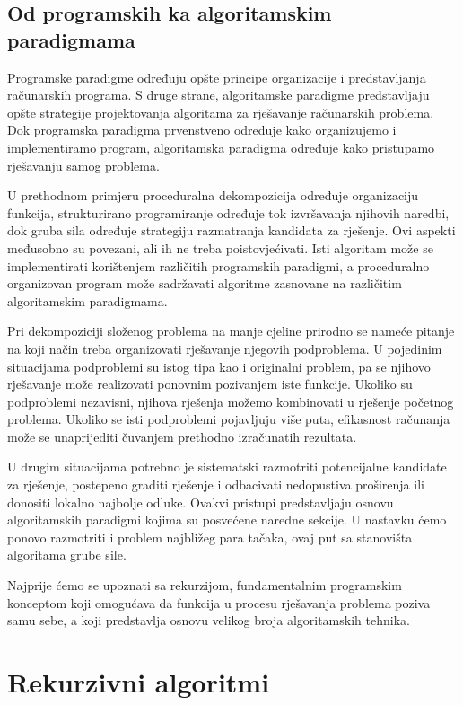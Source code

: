 \subsection{Od programskih ka algoritamskim paradigmama}

Programske paradigme određuju opšte principe organizacije i predstavljanja računarskih programa. S druge strane, algoritamske paradigme predstavljaju opšte strategije projektovanja algoritama za rješavanje računarskih problema. Dok programska paradigma prvenstveno određuje kako organizujemo i implementiramo program, algoritamska paradigma određuje kako pristupamo rješavanju samog problema.

U prethodnom primjeru proceduralna dekompozicija određuje organizaciju funkcija, strukturirano programiranje određuje tok izvršavanja njihovih naredbi, dok gruba sila određuje strategiju razmatranja kandidata za rješenje. Ovi aspekti međusobno su povezani, ali ih ne treba poistovjećivati. Isti algoritam može se implementirati korištenjem različitih programskih paradigmi, a proceduralno organizovan program može sadržavati algoritme zasnovane na različitim algoritamskim paradigmama.

Pri dekompoziciji složenog problema na manje cjeline prirodno se nameće pitanje na koji način treba organizovati rješavanje njegovih podproblema. U pojedinim situacijama podproblemi su istog tipa kao i originalni problem, pa se njihovo rješavanje može realizovati ponovnim pozivanjem iste funkcije. Ukoliko su podproblemi nezavisni, njihova rješenja možemo kombinovati u rješenje početnog problema. Ukoliko se isti podproblemi pojavljuju više puta, efikasnost računanja može se unaprijediti čuvanjem prethodno izračunatih rezultata.

U drugim situacijama potrebno je sistematski razmotriti potencijalne kandidate za rješenje, postepeno graditi rješenje i odbacivati nedopustiva proširenja ili donositi lokalno najbolje odluke. Ovakvi pristupi predstavljaju osnovu algoritamskih paradigmi kojima su posvećene naredne sekcije. U nastavku ćemo ponovo razmotriti i problem najbližeg para tačaka, ovaj put sa stanovišta algoritama grube sile.

Najprije ćemo se upoznati sa rekurzijom, fundamentalnim programskim konceptom koji omogućava da funkcija u procesu rješavanja problema poziva samu sebe, a koji predstavlja osnovu velikog broja algoritamskih tehnika.

\section{Rekurzivni algoritmi}

